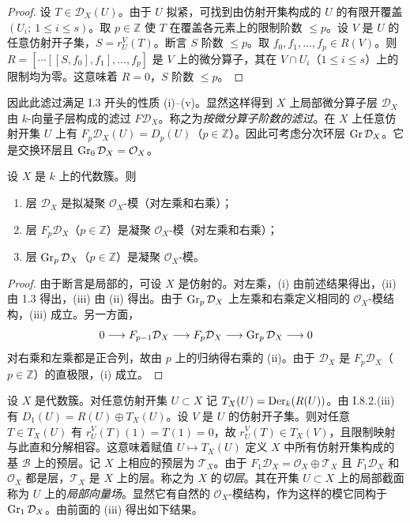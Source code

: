 \begin{proof}
设 $T\in\mathcal{D}_X(U)$。由于 $U$ 拟紧，可找到由仿射开集构成的 $U$ 的有限开覆盖 $(U_i;\ 1\le i\le s)$。取 $p\in\mathbb{Z}$ 使 $T$ 在覆盖各元素上的限制阶数 $\le p$。设 $V$ 是 $U$ 的任意仿射开子集，$S=r^V_U(T)$。断言 $S$ 阶数 $\le p$。取 $f_0,f_1,\dots,f_p\in R(V)$。则 $R=[\cdots[[S,f_0],f_1],\dots,f_p]$ 是 $V$ 上的微分算子，其在 $V\cap U_i$（$1\le i\le s$）上的限制均为零。这意味着 $R=0$，$S$ 阶数 $\le p$。
\end{proof}

因此此滤过满足 I.3 开头的性质 (i)--(v)。显然这样得到 $X$ 上局部微分算子层 $\mathcal{D}_X$ 由 $k$-向量子层构成的滤过 $F\mathcal{D}_X$。称之为\emph{按微分算子阶数的滤过}。在 $X$ 上任意仿射开集 $U$ 上有 $F_p\mathcal{D}_X(U)=D_p(U)$（$p\in\mathbb{Z}$）。因此可考虑分次环层 $\operatorname{Gr}\mathcal{D}_X$。它是交换环层且 $\operatorname{Gr}_0\mathcal{D}_X=\mathcal{O}_X$。

\begin{theorem}
设 $X$ 是 $k$ 上的代数簇。则
\begin{enumerate}[label=(\roman*)]
  \item 层 $\mathcal{D}_X$ 是拟凝聚 $\mathcal{O}_X$-模（对左乘和右乘）；
  \item 层 $F_p\mathcal{D}_X$（$p\in\mathbb{Z}$）是凝聚 $\mathcal{O}_X$-模（对左乘和右乘）；
  \item 层 $\operatorname{Gr}_p\mathcal{D}_X$（$p\in\mathbb{Z}$）是凝聚 $\mathcal{O}_X$-模。
\end{enumerate}
\end{theorem}

\begin{proof}
由于断言是局部的，可设 $X$ 是仿射的。对左乘，(i) 由前述结果得出，(ii) 由 1.3 得出，(iii) 由 (ii) 得出。由于 $\operatorname{Gr}_p\mathcal{D}_X$ 上左乘和右乘定义相同的 $\mathcal{O}_X$-模结构，(iii) 成立。另一方面，
$$0\longrightarrow F_{p-1}\mathcal{D}_X\longrightarrow F_p\mathcal{D}_X\longrightarrow\operatorname{Gr}_p\mathcal{D}_X\longrightarrow 0$$
对右乘和左乘都是正合列，故由 $p$ 上的归纳得右乘的 (ii)。由于 $\mathcal{D}_X$ 是 $F_p\mathcal{D}_X$（$p\in\mathbb{Z}$）的直极限，(i) 成立。
\end{proof}

设 $X$ 是代数簇。对任意仿射开集 $U\subset X$ 记 $T_X(U)=\operatorname{Der}_k(R(U))$。由 I.8.2.(iii) 有 $D_1(U)=R(U)\oplus T_X(U)$。设 $V$ 是 $U$ 的仿射开子集。则对任意 $T\in T_X(U)$ 有 $r^V_U(T)(1)=T(1)=0$，故 $r^V_U(T)\in T_X(V)$，且限制映射与此直和分解相容。这意味着赋值 $U\longmapsto T_X(U)$ 定义 $X$ 中所有仿射开集构成的基 $\mathcal{B}$ 上的预层。记 $X$ 上相应的预层为 $\mathcal{T}_X$。由于 $F_1\mathcal{D}_X=\mathcal{O}_X\oplus\mathcal{T}_X$ 且 $F_1\mathcal{D}_X$ 和 $\mathcal{O}_X$ 都是层，$\mathcal{T}_X$ 是 $X$ 上的层。称之为 $X$ 的\emph{切层}。其在开集 $U\subset X$ 上的局部截面称为 $U$ 上的\emph{局部向量场}。显然它有自然的 $\mathcal{O}_X$-模结构，作为这样的模它同构于 $\operatorname{Gr}_1\mathcal{D}_X$。由前面的 (iii) 得出如下结果。

